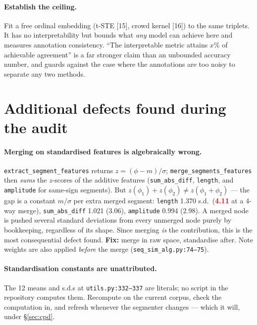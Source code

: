 \documentclass[11pt]{article}
\newcommand{\code}[1]{\texttt{\small #1}}
\newcommand{\finding}[1]{\textcolor{red}{\textbf{#1}}}
\begin{document}
\paragraph{Establish the ceiling.} Fit a free ordinal embedding (t-STE [15], crowd kernel
[16]) to the same triplets. It has no interpretability but bounds what \emph{any} model can
achieve here and measures annotation consistency. ``The interpretable metric attains $x\%$ of
achievable agreement'' is a far stronger claim than an unbounded accuracy number, and guards
against the case where the annotations are too noisy to separate any two methods.

\section{Additional defects found during the audit}
\label{sec:cross}

\paragraph{Merging on standardised features is algebraically wrong.}
\code{extract\_segment\_features} returns $z = (\phi-m)/\sigma$;
\code{merge\_segments\_features} then \emph{sums} the $z$-scores of the additive features
(\code{sum\_abs\_diff}, \code{length}, and \code{amplitude} for same-sign segments). But
$z(\phi_1)+z(\phi_2) \neq z(\phi_1+\phi_2)$ --- the gap is a constant $m/\sigma$ per extra
merged segment: \code{length} 1.370 s.d.\ (\finding{4.11} at a 4-way merge),
\code{sum\_abs\_diff} 1.021 (3.06), \code{amplitude} 0.994 (2.98). A merged node is pushed
several standard deviations from every unmerged node purely by bookkeeping, regardless of its
shape. Since merging \emph{is} the contribution, this is the most consequential defect found.
\textbf{Fix:} merge in raw space, standardise after. Note weights are also applied \emph{before}
the merge (\code{seq\_sim\_alg.py:74--75}).

\paragraph{Standardisation constants are unattributed.} The 12 means and s.d.s at
\code{utils.py:332--337} are literals; no script in the repository computes them. Recompute
on the current corpus, check the computation in, and refresh whenever the segmenter changes
--- which it will, under \S\ref{sec:cpd}.
\end{document}
